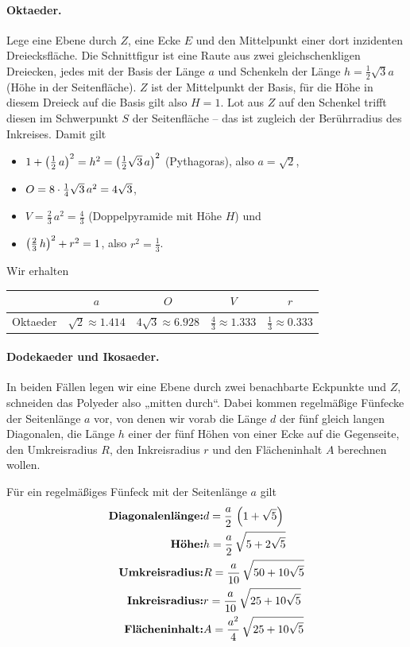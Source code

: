 \documentclass[11pt]{article}
\begin{document}
\paragraph{Oktaeder.}
Lege eine Ebene durch $Z$, eine Ecke $E$ und den Mittelpunkt einer dort
inzidenten Dreiecksfläche. Die Schnittfigur ist eine Raute aus zwei
gleichschenkligen Dreiecken, jedes mit der Basis der Länge $a$ und Schenkeln
der Länge $h=\frac12\sqrt{3}a$ (Höhe in der Seitenfläche). $Z$ ist der
Mittelpunkt der Basis, für die Höhe in diesem Dreieck auf die Basis gilt also
$H=1$.  Lot aus $Z$ auf den Schenkel trifft diesen im Schwerpunkt $S$ der
Seitenfläche -- das ist zugleich der Berührradius des Inkreises. Damit gilt
\begin{itemize}
\item $1+\left(\frac12\,a\right)^2=h^2=\left(\frac12\sqrt{3}\,a\right)^2$ (Pythagoras), also
  $a=\sqrt{2}$, 
\item $O=8\cdot\frac14\sqrt{3}\,a^2=4\sqrt{3}$, 
\item $V=\frac23\,a^2=\frac43$ (Doppelpyramide mit Höhe $H$) und 
\item $\left(\frac23\,h\right)^2+r^2=1$, also $r^2=\frac13$.
\end{itemize}
Wir erhalten 
\begin{center}
  \begin{tabular}{|l|c|c|c|c|}\hline
    & $a$ & $O$ & $V$ & $r$ \\\hline
    Oktaeder & $\sqrt{2}\approx 1.414$ & $4\sqrt{3}\approx 6.928$ &
    $\frac43 \approx 1.333$ & $\frac13 \approx 0.333$ \\\hline
  \end{tabular}
\end{center}

\paragraph{Dodekaeder und Ikosaeder.}
In beiden Fällen legen wir eine Ebene durch zwei benachbarte Eckpunkte und
$Z$, schneiden das Polyeder also „mitten durch“.  Dabei kommen regelmäßige
Fünfecke der Seitenlänge $a$ vor, von denen wir vorab die Länge $d$ der fünf
gleich langen Diagonalen, die Länge $h$ einer der fünf Höhen von einer Ecke
auf die Gegenseite, den Umkreisradius $R$, den Inkreisradius $r$ und den
Flächeninhalt $A$ berechnen wollen.

\begin{satz}
  Für ein regelmäßiges Fünfeck mit der Seitenlänge $a$ gilt
  \begin{align*}
    \text{\bf Diagonalenlänge:} & d=\frac{a}{2}\,\left(1+\sqrt{5}\right)\\
    \text{\bf Höhe:} & h=\frac{a}{2}\,\sqrt{5+2\sqrt{5}}\\
    \text{\bf Umkreisradius:} & R=\frac{a}{10}\,\sqrt{50+10\sqrt{5}}\\
    \text{\bf Inkreisradius:} & r=\frac{a}{10}\,\sqrt{25+10\sqrt{5}}\\
    \text{\bf Flächeninhalt:} & A=\frac{a^2}{4}\,\sqrt{25+10\sqrt{5}}
  \end{align*}
\end{satz}
\end{document}
